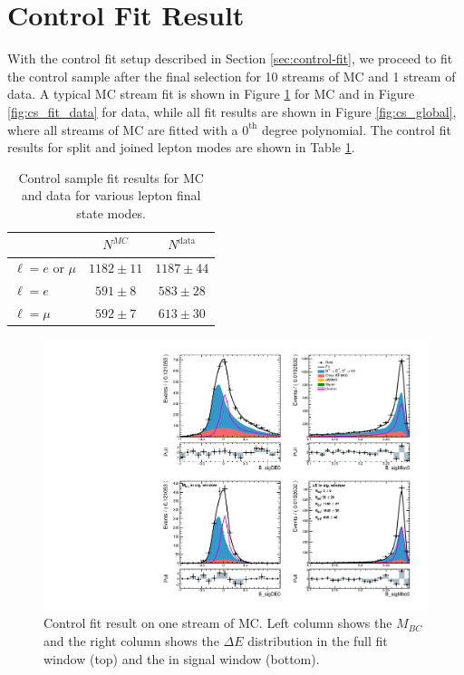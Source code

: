 \section{Control Fit Result}
With the control fit setup described in Section \ref{sec:control-fit}, we proceed to fit the control sample after the final selection for 10 streams of MC and 1 stream of data. A typical MC stream fit is shown in Figure \ref{fig:cs_fit_mc} for MC and in Figure \ref{fig:cs_fit_data} for data, while all fit results are shown in Figure \ref{fig:cs_global}, where all streams of MC are fitted with a $0^{\mathrm{th}}$ degree polynomial. The control fit results for split and joined lepton modes are shown in Table \ref{tab:cs_fit_yield}.
\begin{table}[H]
	\centering
	\begin{tabular}{l|c|c}
		
		& $N^{MC}$ & $N^{\mathrm{data}}$ \\
		\toprule
		$\ell = e$ or $\mu$ & $1182 \pm 11$ & $1187 \pm 44$\\
		$\ell = e$ & $591 \pm 8$ & $583 \pm 28$ \\
		$\ell = \mu$ & $592 \pm 7$ & $613 \pm 30$\\
		\bottomrule
	\end{tabular}
	\captionsetup{width=0.8\linewidth}
	\caption{Control sample fit results for MC and data for various lepton final state modes.}
	\label{tab:cs_fit_yield}
\end{table}

\begin{figure}[H]
	\centering
	\captionsetup{width=0.8\linewidth}
	\includegraphics[width=\linewidth]{fig/cs_fit_mc}
	\caption{Control fit result on one stream of MC. Left column shows the $M_{BC}$ and the right column shows the $\Delta E$ distribution in the full fit window (top) and the in signal window (bottom).}
	\label{fig:cs_fit_mc}
\end{figure}

